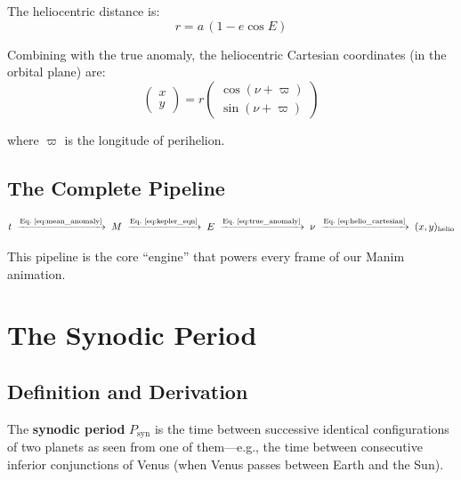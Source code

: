 \documentclass[11pt,letterpaper]{article}
\theoremstyle{definition}
\theoremstyle{plain}
\theoremstyle{remark}
\begin{document}
The heliocentric distance is:
\begin{equation}
  r = a\,(1 - e\cos E)
  \label{eq:helio_distance}
\end{equation}

Combining with the true anomaly, the heliocentric Cartesian
coordinates (in the orbital plane) are:
\begin{equation}
  \begin{pmatrix} x \\ y \end{pmatrix}
  = r \begin{pmatrix} \cos(\nu + \varpi) \\ \sin(\nu + \varpi) \end{pmatrix}
  \label{eq:helio_cartesian}
\end{equation}

where $\varpi$ is the longitude of perihelion.

\subsection{The Complete Pipeline}

\begin{equation}
  t \;\xrightarrow{\text{Eq.~\ref{eq:mean_anomaly}}}\;
  M \;\xrightarrow{\text{Eq.~\ref{eq:kepler_eqn}}}\;
  E \;\xrightarrow{\text{Eq.~\ref{eq:true_anomaly}}}\;
  \nu \;\xrightarrow{\text{Eq.~\ref{eq:helio_cartesian}}}\;
  (x,y)_{\text{helio}}
  \label{eq:pipeline}
\end{equation}

This pipeline is the core ``engine'' that powers every frame of our
Manim animation.


\section{The Synodic Period}
\label{sec:synodic}

\subsection{Definition and Derivation}

The \textbf{synodic period} $P_{\text{syn}}$ is the time between
successive identical configurations of two planets as seen from one
of them—e.g., the time between consecutive inferior conjunctions
of Venus (when Venus passes between Earth and the Sun).
\end{document}
